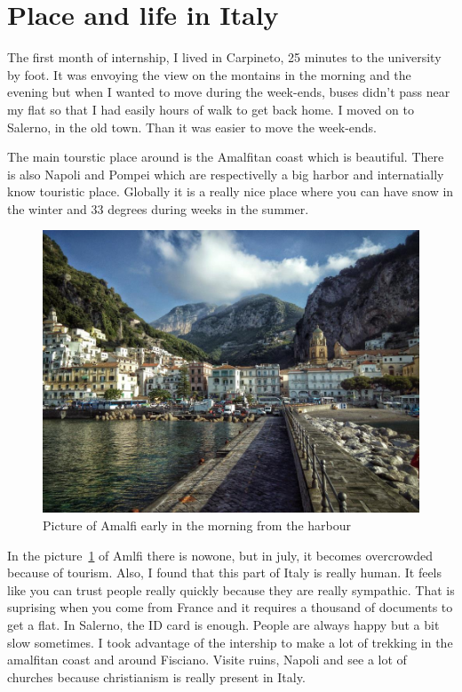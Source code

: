  \section{Place and life in Italy}
 
 \par The first month of internship, I lived in Carpineto, 25 minutes to the university by foot. It was envoying the view on the montains in the morning and the evening but when I wanted to move during the week-ends, buses didn't pass near my flat so that I had easily hours of walk to get back home. I moved on to Salerno, in the old town. Than it was easier to move the week-ends. 
 \par The main tourstic place around is the Amalfitan coast which is beautiful. There is also Napoli and Pompei which are respectivelly a big harbor and internatially know touristic place. Globally it is a really nice place where you can have snow in the winter and 33 degrees during weeks in the summer. 
  \begin{figure}[h]
 \begin{center}
	 \includegraphics[width=12cm]{images_not_compressed/amalfi.jpg}
		\caption{Picture of Amalfi early in the morning from the harbour}
		\label{amalfi}
	 \end{center}
 \end{figure}

 \par In the picture~\ref{amalfi} of Amlfi there is nowone, but in july, it becomes overcrowded because of tourism. Also, I found that this part of Italy is really human. It feels like you can trust people really quickly because they are really sympathic. That is suprising when you come from France and it requires a thousand of documents to get a flat. In Salerno, the ID card is enough. People are always happy but a bit slow sometimes.
 I took advantage of the intership to make a lot of trekking in the amalfitan coast and around Fisciano. Visite ruins, Napoli and see a lot of churches because christianism is really present in Italy.
